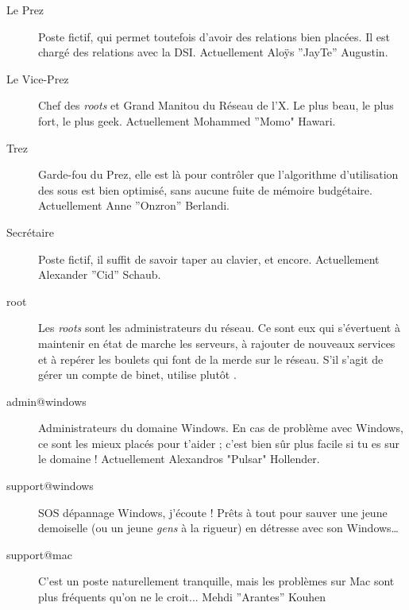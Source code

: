\begin{description}

  \item[Le Prez]{Poste fictif, qui permet toutefois d'avoir des relations bien placées. Il est chargé des relations avec la DSI. Actuellement Aloÿs ''JayTe'' Augustin.}
  
  \item[Le Vice-Prez]{Chef des \emph{roots} et Grand Manitou du Réseau de l'X. Le plus beau, le plus fort, le plus geek. Actuellement Mohammed ''Momo" Hawari.}

  \item[Trez]{Garde-fou du Prez, elle est là pour contrôler que l'algorithme d'utilisation des sous est bien optimisé, sans aucune fuite de mémoire budgétaire. Actuellement Anne ''Onzron'' Berlandi.}

  \item[Secrétaire]{Poste fictif, il suffit de savoir taper au clavier, et encore. Actuellement Alexander ''Cid'' Schaub.}

  \item[root]{Les \emph{roots} sont les administrateurs du réseau. Ce sont eux qui s'évertuent à maintenir en état de marche les serveurs, à rajouter de 
  nouveaux services et à repérer les boulets qui font de la merde sur le réseau. S'il s'agit de gérer un compte de binet, utilise plutôt .}

  \item[admin@windows] {Administrateurs du domaine Windows. En cas de problème avec Windows, ce sont les mieux placés pour t'aider ;
  c'est bien sûr  plus facile si tu es sur le domaine ! Actuellement Alexandros "Pulsar" Hollender.}
  
  \item[support@windows] {SOS dépannage Windows, j'écoute ! Prêts à tout pour sauver une jeune demoiselle (ou un jeune \emph{gens} à la rigueur) en détresse avec son Windows\dots }

  \item[support@mac] {C'est un poste naturellement tranquille, mais les problèmes sur Mac sont plus fréquents qu'on ne le croit... Mehdi ''Arantes'' Kouhen}
  
  


\end{description}
